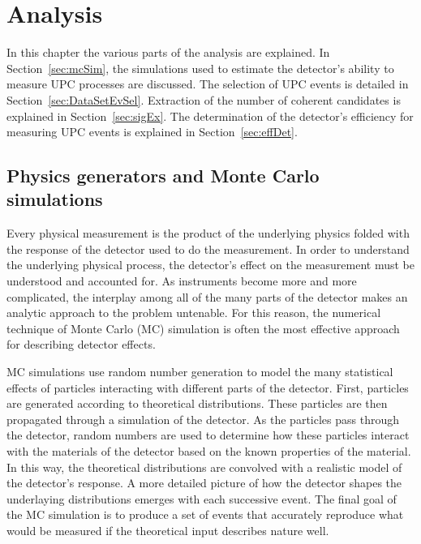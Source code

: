 \chapter{\label{ch:analysis}Analysis}
  In this chapter the various parts of the analysis are explained. 
  In Section~\ref{sec:mcSim}, the simulations used to estimate the detector's 
    ability to measure UPC processes are discussed. 
  The selection of UPC events is detailed in Section~\ref{sec:DataSetEvSel}.
  Extraction of the number of coherent \JPsi{} candidates is explained in 
    Section~\ref{sec:sigEx}.
  The determination of the detector's efficiency for measuring UPC events is 
    explained in Section~\ref{sec:effDet}.

  \section{\label{sec:mcSim} Physics generators and Monte Carlo simulations}
    Every physical measurement is the product of the underlying physics 
      folded with the response of the detector used to do the measurement. 
    In order to understand the underlying physical process, the detector's 
      effect on the measurement must be understood and accounted for. 
    As instruments become more and more complicated, the interplay among all
      of the many parts of the detector makes an analytic approach to the 
      problem untenable.
    For this reason, the numerical technique of Monte Carlo (MC) simulation is
      often the most effective approach for describing detector effects.

    MC simulations use random number generation to model the many statistical 
      effects of particles interacting with different parts of the detector. 
    First, particles are generated according to theoretical distributions.
    These particles are then propagated through a simulation of the detector.
    As the particles pass through the detector, random numbers are used
      to determine how these particles interact with the materials of the 
      detector based on the known properties of the material. 
    In this way, the theoretical distributions are convolved with a realistic 
      model of the detector's response. 
    A more detailed picture of how the detector shapes the underlaying 
      distributions emerges with each successive event.
    The final goal of the MC simulation is to produce a set of events that 
      accurately reproduce what would be measured if the theoretical input 
      describes nature well. 

